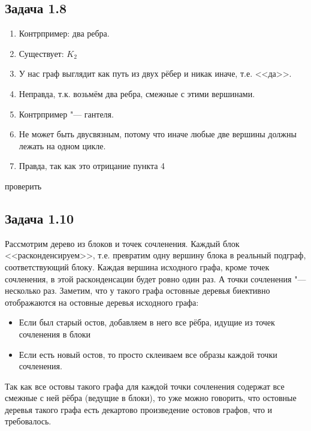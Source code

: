 \subsection{Задача 1.8}
	\begin{enumerate}
	\item Контрпример: два ребра.
	\item Существует: $K_2$
	\item У нас граф выглядит как путь из двух рёбер и никак иначе, т.е. <<да>>.
	\item Неправда, т.к. возьмём два ребра, смежные с этими вершинами.
	\item Контрпример "--- гантеля.
	\item Не может быть двусвязным, потому что иначе любые две вершины должны лежать на одном цикле.
	\item Правда, так как это отрицание пункта 4
	\end{enumerate}
	\TODO проверить

\subsection{Задача 1.10}
	Рассмотрим дерево из блоков и точек сочленения.
	Каждый блок <<расконденсируем>>, т.е. превратим одну вершину блока в реальный подграф, соответствующий блоку.
	Каждая вершина исходного графа, кроме точек сочленения, в этой расконденсации будет ровно один раз.
	А точки сочленения "--- несколько раз.
	Заметим, что у такого графа остовные деревья биективно отображаются на остовные деревья исходного графа:
	\begin{itemize}
		\item Если был старый остов, добавляем в него все рёбра, идущие из точек сочленения в блоки
		\item Если есть новый остов, то просто склеиваем все образы каждой точки сочленения.
	\end{itemize}
	Так как все остовы такого графа для каждой точки сочленения содержат все смежные с ней рёбра (ведущие в блоки),
	то уже можно говорить, что остовные деревья такого графа есть декартово произведение остовов графов, что и требовалось.
